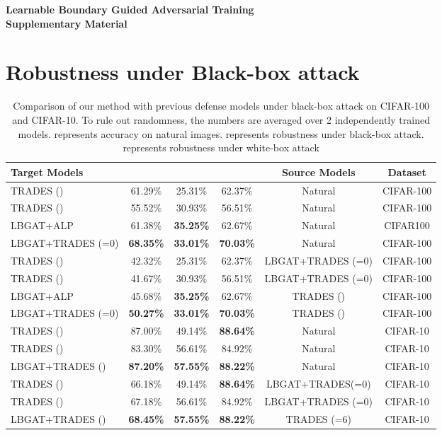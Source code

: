 \documentclass[10pt,twocolumn,letterpaper]{article}
\begin{document}
{\small


}

\newpage
\onecolumn
\appendix

\begin{center}
	\Large \textbf{Learnable Boundary Guided Adversarial Training}
	\Large \\ \textbf{Supplementary Material}
\end{center}
\vspace{20pt}

\vspace{1.0in}	
\section{Robustness under Black-box attack}

\begin{table*}[h]
	\centering
	\caption{Comparison of our method with previous defense models under black-box attack on CIFAR-100 and CIFAR-10. To rule out randomness, the numbers are averaged over 2 independently trained models.  represents accuracy on natural images.  represents robustness under black-box attack.  represents robustness under white-box attack}
	\begin{tabular}{l|c|c | c | c|c }
		\textbf{Target Models} & &  &  &\textbf{Source Models}  &\textbf{Dataset}\\
		\hline
		\hline
		TRADES ()  &61.29\%  &25.31\%  &62.37\%  &Natural &CIFAR-100\\
		TRADES ()  &55.52\%  &30.93\%  &56.51\%  &Natural &CIFAR-100\\
		LBGAT+ALP            &61.38\%  &\textbf{35.25\%}  &62.67\%  &Natural &CIFAR100\\
		LBGAT+TRADES (=0)  &\textbf{68.35\%} &\textbf{33.01\%} &\textbf{70.03\%} &Natural &CIFAR-100\\
		\hline
		TRADES () &42.32\% &25.31\% &62.37\% &LBGAT+TRADES (=0) &CIFAR-100\\
		TRADES () &41.67\% &30.93\% &56.51\% &LBGAT+TRADES (=0) &CIFAR-100\\
		LBGAT+ALP     &45.68\% &\textbf{35.25\%} &62.67\% &TRADES ()  &CIFAR-100\\
		LBGAT+TRADES (=0) &\textbf{50.27\%} &\textbf{33.01\%}  &\textbf{70.03\%} &TRADES () &CIFAR-100\\
		\hline
		TRADES ()  &87.00\% &49.14\%  &\textbf{88.64\%}  &Natural &CIFAR-10\\
		TRADES ()  &83.30\% &56.61\%  &84.92\%  &Natural &CIFAR-10\\
		LBGAT+TRADES ()      &\textbf{87.20\%} &\textbf{57.55\%} &\textbf{88.22\%} &Natural &CIFAR-10\\
		\hline
		TRADES () &66.18\% &49.14\% &\textbf{88.64\%} &LBGAT+TRADES(=0) &CIFAR-10\\
		TRADES () &67.18\% &56.61\% &84.92\% &LBGAT+TRADES (=0) &CIFAR-10\\
		LBGAT+TRADES ()     &\textbf{68.45\%} &\textbf{57.55\%} &\textbf{88.22\%} &TRADES (=6) &CIFAR-10\\
		\hline
		\hline
	\end{tabular}
	\label{tab:black-box_cifar100_cifar10}
\end{table*}
\end{document}
